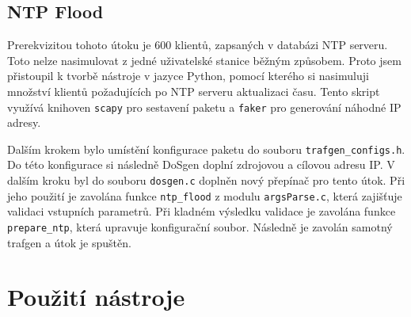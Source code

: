 \subsection{NTP Flood}

Prerekvizitou tohoto útoku je 600 klientů, zapsaných v databázi NTP serveru. Toto nelze nasimulovat z jedné uživatelské stanice běžným způsobem. Proto jsem přistoupil k tvorbě nástroje v jazyce Python, pomocí kterého si nasimuluji množství klientů požadujících po NTP serveru aktualizaci času. Tento skript využívá knihoven \texttt{scapy} pro sestavení paketu a \texttt{faker} pro generování náhodné IP adresy.

Dalším krokem bylo umístění konfigurace paketu do souboru \texttt{trafgen\_configs.h}. Do této konfigurace si následně DoSgen doplní zdrojovou a cílovou adresu IP. 
V dalším kroku byl do souboru \texttt{dosgen.c} doplněn nový přepínač pro tento útok. Při jeho použití je zavolána funkce \texttt{ntp\_flood} z modulu \texttt{argsParse.c}, která zajišťuje validaci vstupních parametrů. Při kladném výsledku validace je zavolána funkce \texttt{prepare\_ntp}, která upravuje konfigurační soubor. Následně je zavolán samotný trafgen a útok je spuštěn.


\section{Použití nástroje}
